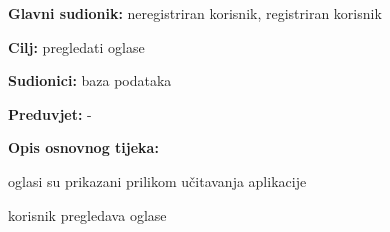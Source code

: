 					\noindent {}
					\begin{packed_item}
						
						\item \textbf{Glavni sudionik: } neregistriran korisnik, registriran korisnik
						\item  \textbf{Cilj:} pregledati oglase
						\item  \textbf{Sudionici:} baza podataka
						\item  \textbf{Preduvjet:} -
						\item  \textbf{Opis osnovnog tijeka:}
						
						\item[] \begin{packed_enum}
							
							\item oglasi su prikazani prilikom učitavanja aplikacije
							\item korisnik pregledava oglase
						\end{packed_enum}
						
					\end{packed_item}
					
